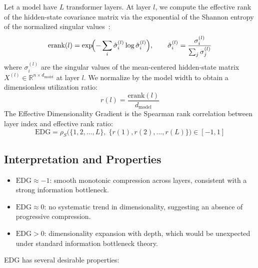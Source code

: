 \documentclass[preprint]{neurips_2025}
\begin{document}
Let a model have $L$ transformer layers. At layer $l$, we compute the effective rank of the hidden-state covariance matrix via the exponential of the Shannon entropy of the normalized singular values~\citep{roy2007effective}:
\begin{equation}
  \text{erank}(l) = \exp\!\Bigl(-\sum_{i} \hat\sigma_i^{(l)} \log \hat\sigma_i^{(l)}\Bigr), \qquad \hat\sigma_i^{(l)} = \frac{\sigma_i^{(l)}}{\sum_j \sigma_j^{(l)}}
  \label{eq:erank}
\end{equation}
where $\sigma_i^{(l)}$ are the singular values of the mean-centered hidden-state matrix $X^{(l)} \in \mathbb{R}^{n \times d_{\text{model}}}$ at layer $l$.
We normalize by the model width to obtain a dimensionless utilization ratio:
\begin{equation}
  r(l) = \frac{\text{erank}(l)}{d_{\text{model}}}
  \label{eq:erank-ratio}
\end{equation}
The Effective Dimensionality Gradient is the Spearman rank correlation between layer index and effective rank ratio:
\begin{equation}
  \text{EDG} = \rho_S\!\bigl(\{1, 2, \ldots, L\},\; \{r(1), r(2), \ldots, r(L)\}\bigr) \in [-1, 1]
  \label{eq:edg}
\end{equation}

\subsection{Interpretation and Properties}
\label{sec:edg-properties}

\begin{itemize}
  \item $\text{EDG} \approx -1$: smooth monotonic compression across layers, consistent with a strong information bottleneck.
  \item $\text{EDG} \approx 0$: no systematic trend in dimensionality, suggesting an absence of progressive compression.
  \item $\text{EDG} > 0$: dimensionality expansion with depth, which would be unexpected under standard information bottleneck theory.
\end{itemize}

\noindent EDG has several desirable properties:
\end{document}
